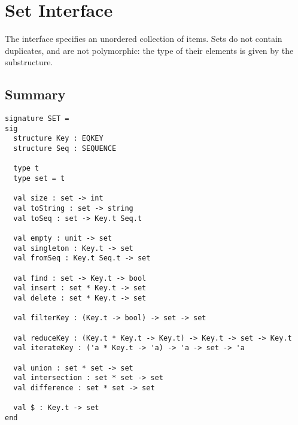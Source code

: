 \chapter{Set Interface}
\label{ch:set-interface}

\begin{cluster}
\label{grp:prmbl:set-interface::interface}

\begin{preamble}
\label{prmbl:set-interface::interface}
The  interface specifies an unordered collection of items. Sets do not
contain duplicates, and are not polymorphic: the type of their elements is
given by the  substructure.

\end{preamble}
\end{cluster}


\section{Summary}
\label{sec:set-interface::summary}

\begin{cluster}
\label{grp:grm:set-interface::signature}

\begin{gram}
\label{grm:set-interface::signature}
\begin{verbatim}
signature SET =
sig
  structure Key : EQKEY
  structure Seq : SEQUENCE

  type t
  type set = t

  val size : set -> int
  val toString : set -> string
  val toSeq : set -> Key.t Seq.t

  val empty : unit -> set
  val singleton : Key.t -> set
  val fromSeq : Key.t Seq.t -> set

  val find : set -> Key.t -> bool
  val insert : set * Key.t -> set
  val delete : set * Key.t -> set

  val filterKey : (Key.t -> bool) -> set -> set

  val reduceKey : (Key.t * Key.t -> Key.t) -> Key.t -> set -> Key.t
  val iterateKey : ('a * Key.t -> 'a) -> 'a -> set -> 'a

  val union : set * set -> set
  val intersection : set * set -> set
  val difference : set * set -> set

  val $ : Key.t -> set
end
\end{verbatim}

\end{gram}
\end{cluster}


